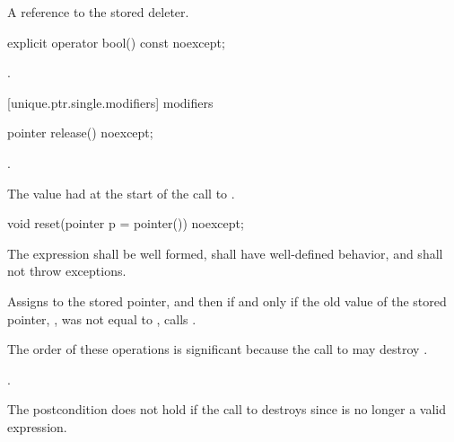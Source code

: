 \begin{itemdescr}
\pnum
\returns A reference to the stored deleter.
\end{itemdescr}

%
\begin{itemdecl}
explicit operator bool() const noexcept;
\end{itemdecl}

\begin{itemdescr}
\pnum
\returns {}.
\end{itemdescr}

[unique.ptr.single.modifiers]{ modifiers}

%
\begin{itemdecl}
pointer release() noexcept;
\end{itemdecl}

\begin{itemdescr}
\pnum
\postconditions {}.

\pnum
\returns The value  had at the start of
the call to .
\end{itemdescr}

%
\begin{itemdecl}
void reset(pointer p = pointer()) noexcept;
\end{itemdecl}

\begin{itemdescr}
\pnum
\requires The expression  shall be well formed, shall have
well-defined behavior, and shall not throw exceptions.

\pnum
\effects Assigns  to the stored pointer, and then if and only if the old value of the
stored pointer, , was not equal to , calls
. \begin{note} The order of these operations is significant
because the call to  may destroy . \end{note}

\pnum
\postconditions {}.
\begin{note} The postcondition does not hold if the call to 
destroys  since  is no longer a valid expression.
\end{note}
\end{itemdescr}

